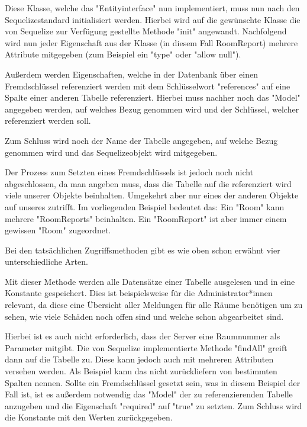 Diese Klasse, welche das "Entityinterface" nun implementiert, muss nun nach den Sequelizestandard initialisiert werden. Hierbei wird auf die gewünschte Klasse die von Sequelize zur Verfügung gestellte Methode "init" angewandt. Nachfolgend wird nun jeder Eigenschaft aus der Klasse (in diesem Fall RoomReport) mehrere Attribute mitgegeben (zum Beispiel ein "type" oder "allow null").

Außerdem werden Eigenschaften, welche in der Datenbank über einen Fremdschlüssel referenziert werden mit dem Schlüsselwort "references" auf eine Spalte einer anderen Tabelle referenziert. Hierbei muss nachher noch das "Model" angegeben werden,
auf welches Bezug genommen wird und der Schlüssel, welcher referenziert werden soll.

Zum Schluss wird noch der Name der Tabelle angegeben, auf welche Bezug genommen wird und das Sequelizeobjekt wird mitgegeben.


Der Prozess zum Setzten eines Fremdschlüssels ist jedoch noch nicht abgeschlossen, da man angeben muss, dass die Tabelle auf die referenziert wird viele unserer Objekte beinhalten. Umgekehrt aber nur eines der anderen Objekte auf unseres zutrifft. Im vorliegenden Beispiel bedeutet das: Ein "Room" kann mehrere "RoomReports" beinhalten. Ein "RoomReport" ist aber immer einem gewissen "Room" zugeordnet.


Bei den tatsächlichen Zugriffsmethoden gibt es wie oben schon erwähnt vier unterschiedliche Arten.


Mit dieser Methode werden alle Datensätze einer Tabelle ausgelesen und in eine Konstante gespeichert. Dies ist beispielsweise für die Administrator*innen relevant, da diese eine Übersicht aller Meldungen für alle Räume benötigen um zu sehen, wie viele Schäden noch offen sind und welche schon abgearbeitet sind.

Hierbei ist es auch nicht erforderlich, dass der Server eine Raumnummer als Parameter mitgibt. Die von Sequelize implementierte Methode "findAll" greift dann auf die Tabelle zu. Diese kann jedoch auch mit mehreren Attributen versehen werden. Als Beispiel kann das nicht zurückliefern von bestimmten Spalten nennen. Sollte ein Fremdschlüssel gesetzt sein, was in diesem Beispiel der Fall ist, ist es außerdem notwendig das "Model" der zu referenzierenden Tabelle anzugeben und die Eigenschaft "required" auf "true" zu setzten. Zum Schluss wird die Konstante mit den Werten zurückgegeben.

